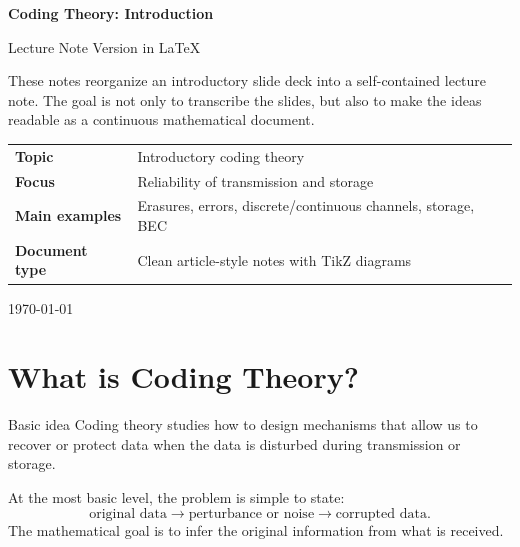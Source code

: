 \documentclass[11pt]{article}
\begin{document}

\begin{titlepage}
\centering
\vspace*{2.2cm}

{\Huge\bfseries\color{ctdark} Coding Theory: Introduction\par}
\vspace{0.5cm}
{\Large Lecture Note Version in LaTeX\par}
\vspace{1.2cm}

\begin{tcolorbox}[colback=ctlight,colframe=ctdark,width=0.88\textwidth,arc=2mm,boxrule=0.8pt]
These notes reorganize an introductory slide deck into a self-contained lecture note.
The goal is not only to transcribe the slides, but also to make the ideas readable as a
continuous mathematical document.
\end{tcolorbox}

\vfill

\begin{tabular}{>{\bfseries}p{}p{}}
Topic & Introductory coding theory \\
Focus & Reliability of transmission and storage \\
Main examples & Erasures, errors, discrete/continuous channels, storage, BEC \\
Document type & Clean article-style notes with TikZ diagrams
\end{tabular}

\vfill

{\large \today\par}
\end{titlepage}

\tableofcontents
\newpage

\section{What is Coding Theory?}

\begin{definitionbox}{Basic idea}
Coding theory studies how to design mechanisms that allow us to recover or protect data
when the data is disturbed during transmission or storage.
\end{definitionbox}

At the most basic level, the problem is simple to state:
\[
\text{original data} \longrightarrow \text{perturbance or noise} \longrightarrow \text{corrupted data}.
\]
The mathematical goal is to infer the original information from what is received.
\end{document}

